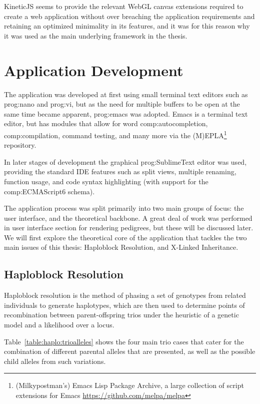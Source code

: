 KineticJS seems to provide the relevant WebGL canvas extensions required to create a web application without over breaching the application requirements and retaining an optimized minimality in its features, and it was for this reason why it was used as the main underlying framework in the thesis.

\section{Application Development}

The application was developed at first using small terminal text editors such as \gls{prog:nano} and \gls{prog:vi}, but as the need for multiple buffers to be open at the same time became apparent, \gls{prog:emacs} was adopted. Emacs is a terminal text editor, but has modules that allow for word \gls{comp:autocompletion}, \gls{comp:compilation}, command testing, and many more via the (M)EPLA\footnote{(Milkypostman's) Emacs Lisp Package Archive, a large collection of script extensions for Emacs \url{https://github.com/melpa/melpa}} repository\citep{stallman1981emacs}.

In later stages of development the graphical \gls{prog:SublimeText} editor was used, providing the standard IDE features such as split views, multiple renaming, function usage, and code syntax highlighting (with support for the \gls{comp:ECMAScript6} schema).

The application process was split primarily into two main groups of focus: the user interface, and the theoretical backbone. A great deal of work was performed in user interface section for rendering pedigrees, but these will be discussed later. We will first explore the theoretical core of the application that tackles the two main issues of this thesis: Haploblock Resolution, and X-Linked Inheritance. 


\subsection{Haploblock Resolution}

Haploblock resolution is the method of phasing a set of genotypes from related individuals to generate haplotypes, which are then used to determine points of recombination between parent-offspring trios under the heuristic of a genetic model and a likelihood over a locus.

Table~\ref{table:haplo:trioalleles} shows the four main trio cases that cater for the combination of different parental alleles that are presented, as well as the possible child alleles from such variations.


